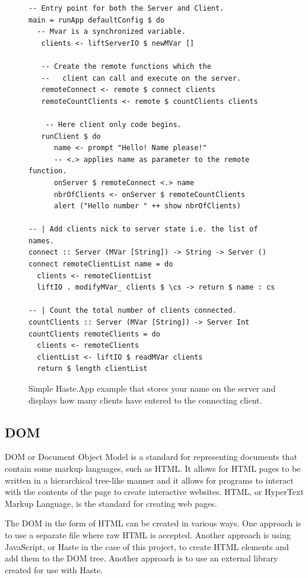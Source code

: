 \documentclass[a4paper]{article}
\begin{document}
\begin{figure}[H]
    \centering  
\begin{lstlisting}  
-- Entry point for both the Server and Client.
main = runApp defaultConfig $ do
  -- Mvar is a synchronized variable.
   clients <- liftServerIO $ newMVar []

   -- Create the remote functions which the
   --   client can call and execute on the server.
   remoteConnect <- remote $ connect clients
   remoteCountClients <- remote $ countClients clients

    -- Here client only code begins.
   runClient $ do
      name <- prompt "Hello! Name please!"
      -- <.> applies name as parameter to the remote function.
      onServer $ remoteConnect <.> name
      nbrOfClients <- onServer $ remoteCountClients
      alert ("Hello number " ++ show nbrOfClients)

-- | Add clients nick to server state i.e. the list of names.
connect :: Server (MVar [String]) -> String -> Server ()
connect remoteClientList name = do
  clients <- remoteClientList
  liftIO . modifyMVar_ clients $ \cs -> return $ name : cs

-- | Count the total number of clients connected.
countClients :: Server (MVar [String]) -> Server Int
countClients remoteClients = do
  clients <- remoteClients
  clientList <- liftIO $ readMVar clients
  return $ length clientList
\end{lstlisting}
    \caption{Simple Haste.App example that stores your name on the server and displays how many clients have entered to the connecting client.}
    \label{fig:haste-app-example}
\end{figure}

\subsection{DOM}
DOM or Document Object Model is a standard for representing documents that contain some markup languages, such as HTML. It allows for HTML pages to be written in a hierarchical tree-like manner and it allows for programs to interact with the contents of the page to create interactive websites. HTML, or HyperText Markup Language, is the standard for creating web pages.

The DOM in the form of HTML can be created in various ways. One approach is to use a separate file where raw HTML is accepted. Another approach is using JavaScript, or Haste in the case of this project, to create HTML elements and add them to the DOM tree. Another approach is to use an external library created for use with Haste. 
\end{document}

